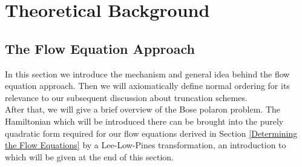 \chapter{Theoretical Background}\label{Theoretical Background}
\section{The Flow Equation Approach}
In this section we introduce the mechanism and general idea behind the flow equation approach. Then we will axiomatically define normal ordering for its relevance to our subsequent discussion about truncation schemes. \\
After that, we will give a brief overview of the Bose polaron problem. The Hamiltonian which will be introduced there can be brought into the purely quadratic form required for our flow equations derived in Section \ref{Determining the Flow Equations} by a Lee-Low-Pines transformation, an introduction to which will be given at the end of this section. %
